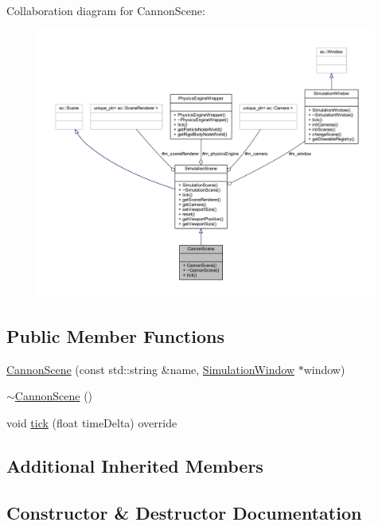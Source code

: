 Collaboration diagram for Cannon\+Scene\+:\nopagebreak
\begin{figure}[H]
\begin{center}
\leavevmode
\includegraphics[width=350pt]{class_cannon_scene__coll__graph}
\end{center}
\end{figure}
\subsection*{Public Member Functions}
\begin{DoxyCompactItemize}
\item 
\mbox{\hyperlink{class_cannon_scene_a2611ce7772956b11afea348e0ada1d1a}{Cannon\+Scene}} (const std\+::string \&name, \mbox{\hyperlink{class_simulation_window}{Simulation\+Window}} $\ast$window)
\item 
\mbox{\hyperlink{class_cannon_scene_af164426b8fb11e4910f53a2517fc9115}{$\sim$\+Cannon\+Scene}} ()
\item 
void \mbox{\hyperlink{class_cannon_scene_a2da031c5f2d38611f07985c6cbc91869}{tick}} (float time\+Delta) override
\end{DoxyCompactItemize}
\subsection*{Additional Inherited Members}


\subsection{Constructor \& Destructor Documentation}
\mbox{\label{class_cannon_scene_a2611ce7772956b11afea348e0ada1d1a}} 
